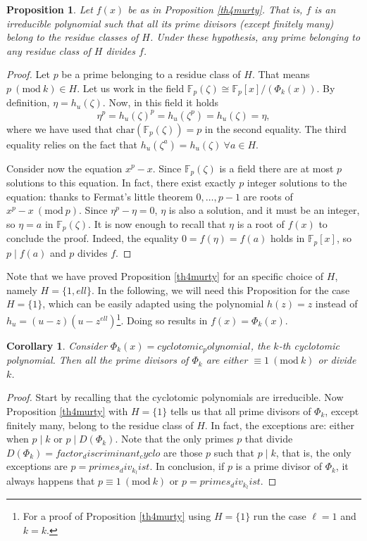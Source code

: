 \documentclass[a4paper, 12pt]{article}
\newtheorem{proposition}[theorem]{Proposition}
\newtheorem{corollary}[theorem]{Corollary}
\theoremstyle{definition}
\theoremstyle{remark}
\newcommand{\F}{\ensuremath{\mathbb{F}}}
\newcommand{\Mod}[1]{\ (\mathrm{mod}\ #1)} %
\begin{document}
\begin{proposition}\label{th5murty}
Let $f(x)$ be as in Proposition \ref{th4murty}. That is, $f$ is an irreducible polynomial such that all its prime divisors (except finitely many) belong to the residue classes of $H$. Under these hypothesis, any prime belonging to any residue class of $H$ divides $f$.
\end{proposition}
\begin{proof}
Let $p$ be a prime belonging to a residue class of $H$. That means $p \Mod{{k}} \in H$. Let us work in the field $\F_p(\zeta)\cong\F_p[x]/(\Phi_{{k}}(x))$. By definition, $\eta=h_{{u}}(\zeta)$. Now, in this field it holds
\begin{equation*}
\eta^p=h_{{u}}(\zeta)^p=h_{{u}}(\zeta^p)=h_{{u}}(\zeta)=\eta,
\end{equation*}
where we have used that $\text{char}(\F_p(\zeta))=p$ in the second equality. The third equality relies on the fact that $h_{{u}}(\zeta^a)=h_{{u}}(\zeta) \ \forall a\in H$.

Consider now the equation $x^p-x$. Since $\F_p(\zeta)$ is a field there are at most $p$ solutions to this equation. In fact, there exist exactly $p$ integer solutions to the equation: thanks to Fermat's little theorem $0,\dots,p-1$ are roots of $x^p-x \Mod{p}$. Since $\eta^p-\eta=0$, $\eta$ is also a solution, and it must be an integer, so $\eta=a$ in $\F_p(\zeta)$. It is now enough to recall that $\eta$ is a root of $f(x)$ to conclude the proof. Indeed, the equality $0=f(\eta)=f(a)$ holds in $\F_p[x]$, so $p \mid f(a)$ and $p$ divides $f$.
\end{proof}

Note that we have proved Proposition \ref{th4murty} for an specific choice of $H$, namely $H=\{1,{ell}\}$. In the following, we will need this Proposition for the case $H=\{1\}$, which can be easily adapted using the polynomial $h(z)=z$ instead of $h_{{u}}=({u}-z)({u}-z^{{ell}})$\footnote{For a proof of Proposition \ref{th4murty} using $H=\{1\}$ run the case $\ell = 1$ and $k={k}$.}. Doing so results in $f(x)=\Phi_{{k}}(x)$.

\begin{corollary}\label{divisors_cyclotomic}
Consider $\Phi_{{k}}(x)={cyclotomic_polynomial}$, the ${k}$-th cyclotomic polynomial. Then all the prime divisors of $\Phi_{{k}}$ are either $\equiv 1\Mod{{k}}$ or divide ${k}$.
\end{corollary}
\begin{proof}
Start by recalling that the cyclotomic polynomials are irreducible. Now Proposition \ref{th4murty} with $H=\{1\}$ tells us that all prime divisors of $\Phi_{{k}}$, except finitely many, belong to the residue class of $H$. In fact, the exceptions are: either when $p\mid {k}$ or $p\mid D(\Phi_{{k}})$. Note that the only primes $p$ that divide $D(\Phi_{{k}})={factor_discriminant_cyclo}$ are those $p$ such that $p\mid {k}$, that is, the only exceptions are $p={primes_div_k_list}$. In conclusion, if $p$ is a prime divisor of $\Phi_{{k}}$, it always happens that $p\equiv 1\Mod{{k}}$ or $p={primes_div_k_list}$.
\end{proof}
\end{document}
